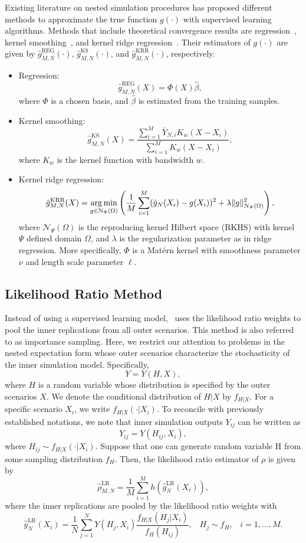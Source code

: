 Existing literature on nested simulation procedures has proposed different methods to approximate the true function $g(\cdot)$ with supervised learning algorithms. 
Methods that include theoretical convergence results are regression~\citep{broadie2015risk}, kernel smoothing~\citep{hong2017kernel}, and kernel ridge regression~\citep{wang2022smooth}.
Their estimators of $g(\cdot)$ are given by $\hat{g}^{\text{REG}}_{M, N}(\cdot)$, $\hat{g}^{\text{KS}}_{M, N}(\cdot)$, and $\hat{g}^{\text{KRR}}_{M, N}(\cdot)$, respectively.

\begin{itemize}
    \item   Regression:
            $$\hat{g}^{\text{REG}}_{M, N}(X) = \Phi(X) \hat{\beta},$$
            where $\Phi$ is a chosen basis, and $\hat{\beta}$ is estimated from the training samples.
    \item   Kernel smoothing:
            $$\hat{g}^{\text{KS}}_{M, N}(X) = \frac{\sum_{i=1}^M \bar{Y}_{N, i} K_w(X - X_i)}{\sum_{i=1}^M K_w(X - X_i)}, $$
            where $K_w$ is the kernel function with bandwidth $w$.
    \item   Kernel ridge regression:
            $$\hat{g}^{\text{KRR}}_{M, N}(X) = \operatorname*{arg\,min}_{g \in \mathcal{N}_{\Psi}(\Omega)} \left( \frac{1}{M} \sum_{i=1}^M (\hat{g}_N(X_i) - g(X_i))^2 + \lambda \|g\|_{\mathcal{N}_{\Psi}(\Omega)}^2\right),$$
            where $\mathcal{N}_{\Psi}(\Omega)$ is the reproducing kernel Hilbert space (RKHS) with kernel $\Psi$ defined domain $\Omega$, and $\lambda$ is the regularization parameter as in ridge regression. 
            More specifically, $\Phi$ is a Mat\'ern kernel with smoothness parameter $\nu$ and length scale parameter $\ell$.
\end{itemize}

\subsection{Likelihood Ratio Method}

Instead of using a supervised learning model,~\cite{zhang2022sample} uses the likelihood ratio weights to pool the inner replications from all outer scenarios.
This method is also referred to as importance sampling.
Here, we restrict our attention to problems in the nested expectation form whose outer scenarios characterize the stochasticity of the inner simulation model. 
Specifically,
$$ Y = Y(H, X), $$
where $H$ is a random variable whose distribution is specified by the outer scenarios $X$. 
We denote the conditional distribution of $H|X$ by $f_{H|X}$. 
For a specific scenario $X_i$, we write $f_{H|X}(\cdot |X_i)$. 
To reconcile with previously established notations, we note that inner simulation outputs $Y_{ij}$ can be written as
$$ Y_{ij} = Y(H_{ij}, X_i), $$
where $H_{ij} \sim f_{H|X}(\cdot |X_i)$.
Suppose that one can generate random variable H from some sampling
distribution $f_H$. Then, the likelihood ratio estimator of $\rho$ is given by
$$\hat{\rho}^{\text{LR}}_{M,N} = \frac{1}{M} \sum_{i=1}^M h(\hat{g}^{\text{LR}}_N(X_i)), $$ where the inner replications are pooled by the likelihood ratio weights with
$$\hat{g}^{\text{LR}}_N(X_i) = \frac{1}{N} \sum_{j=1}^N Y(H_j, X_i) \frac{f_{H|X}(H_{j}|X_i)}{f_H(H_{ij})}, \;\;\; H_j \sim f_H, \;\;\; i=1, \dots, M.$$

